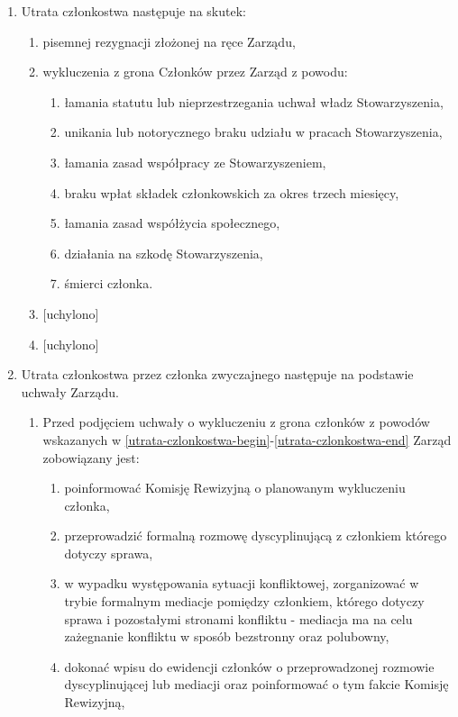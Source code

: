 \documentclass{article}
\begin{document}
\begin{enumerate}
    \item Utrata członkostwa następuje na skutek:
      \begin{enumerate}
        \item pisemnej rezygnacji złożonej na ręce Zarządu,
        \item wykluczenia z grona Członków przez Zarząd z powodu:
          \begin{enumerate}
            \item łamania statutu lub nieprzestrzegania uchwał władz Stowarzyszenia, \label{utrata-czlonkostwa-begin}
            \item unikania lub notorycznego braku udziału w pracach Stowarzyszenia,
            \item łamania zasad współpracy ze Stowarzyszeniem,
            \item braku wpłat składek członkowskich za okres trzech miesięcy,
            \item łamania zasad współżycia społecznego,
            \item działania na szkodę Stowarzyszenia,
            \item śmierci członka. \label{utrata-czlonkostwa-end}
          \end{enumerate}
        \item {[uchylono]}
        \item {[uchylono]}
      \end{enumerate}
      \item Utrata członkostwa przez członka zwyczajnego następuje na podstawie uchwały Zarządu.
      \begin{enumerate}
        \item Przed podjęciem uchwały o wykluczeniu z grona członków z powodów wskazanych w \ref{utrata-czlonkostwa-begin}-\ref{utrata-czlonkostwa-end} Zarząd zobowiązany jest: \label{przed-usunieciem-czlonka}
        \begin{enumerate}
          \item poinformować Komisję Rewizyjną o planowanym wykluczeniu członka,
          \item przeprowadzić formalną rozmowę dyscyplinującą z członkiem którego dotyczy sprawa,
          \item w wypadku występowania sytuacji konfliktowej, zorganizować w trybie formalnym mediacje pomiędzy członkiem, którego dotyczy sprawa i pozostałymi stronami konfliktu - mediacja ma na celu zażegnanie konfliktu w sposób bezstronny oraz polubowny,
          \item dokonać wpisu do ewidencji członków o przeprowadzonej rozmowie dyscyplinującej lub mediacji oraz poinformować o tym fakcie Komisję Rewizyjną,

\end{enumerate}
\end{enumerate}
\end{enumerate}
\end{document}

